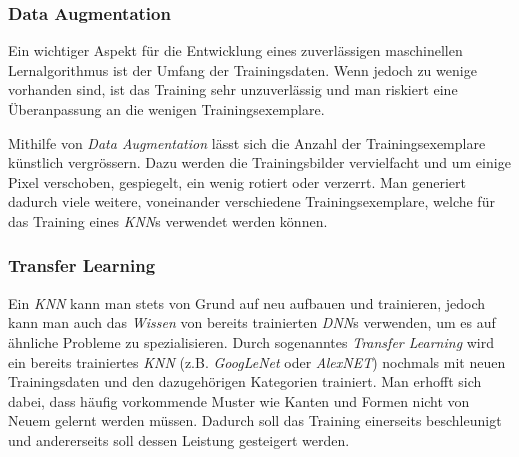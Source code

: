 

\subsubsection{Data Augmentation} \label{cha:theo:mod:da}

Ein wichtiger Aspekt für die Entwicklung eines zuverlässigen maschinellen Lernalgorithmus ist der Umfang der Trainingsdaten. Wenn jedoch zu wenige vorhanden sind, ist das Training sehr unzuverlässig und man riskiert eine Überanpassung an die wenigen Trainingsexemplare.

Mithilfe von \textit{Data Augmentation} lässt sich die Anzahl der Trainingsexemplare künstlich vergrössern. Dazu werden die Trainingsbilder vervielfacht und um einige Pixel verschoben, gespiegelt, ein wenig rotiert oder verzerrt. Man generiert dadurch viele weitere, voneinander verschiedene Trainingsexemplare, welche für das Training eines \textit{KNN}s verwendet werden können.

\subsubsection{Transfer Learning}\label{cha:theo:mod:tl}

Ein \textit{KNN} kann man stets von Grund auf neu aufbauen und trainieren, jedoch kann man auch das \textit{Wissen} von bereits trainierten \textit{DNN}s verwenden, um es auf ähnliche Probleme zu spezialisieren. Durch sogenanntes \textit{Transfer Learning} wird ein bereits trainiertes \textit{KNN} (z.B. \textit{GoogLeNet} oder \textit{AlexNET}) nochmals mit neuen Trainingsdaten und den dazugehörigen Kategorien trainiert. Man erhofft sich dabei, dass häufig vorkommende Muster wie Kanten und Formen nicht von Neuem gelernt werden müssen. Dadurch soll das Training einerseits beschleunigt und andererseits soll dessen Leistung gesteigert werden.

